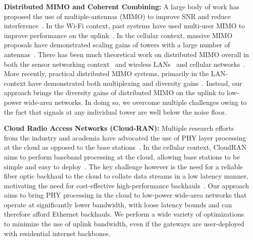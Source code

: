 \noindent \textbf{Distributed MIMO and Coherent Combining: } A large body of work has proposed the use of multiple-antennas (MIMO) to improve SNR and reduce interference~\cite{xie2014scalable, lin2011random, kumar2013bringing}. In the Wi-Fi context, past systems have used multi-user MIMO to improve performance on the uplink~\cite{shen2014rate, tan2009sam, xie2014scalable}. In the cellular context, massive MIMO proposals have demonstrated scaling gains of towers with a large number of antennas~\cite{shepard2012argos, larsson2014massive}. There has been much theoretical work on distributed MIMO overall in both the sensor networking context~\cite{del2007cooperative} and wireless LANs~\cite{dohler2004resource} and cellular networks~\cite{sawahashi2010coordinated}.  More recently, practical distributed MIMO systems, primarily in the LAN-context have demonstrated both multiplexing and diversity gains~\cite{hamed2016real, yenamandra2014vidyut, rahul2012jmb}. Instead, our approach brings the diversity gains of distributed MIMO on the uplink to low-power wide-area networks. In doing so, we overcome multiple challenges owing to the fact that signals at any individual tower are well below the noise floor. \\\vspace*{-0.1in}


\noindent \textbf{Cloud Radio Access Networks (Cloud-RAN): } Multiple research efforts from the industry and academia have advocated the use of PHY layer processing at the cloud as opposed to the base stations~\cite{sabella2013ran, hadzialic2013cloud}. In the cellular context, CloudRAN aims to perform baseband processing at the cloud, allowing base stations to be simple and easy to deploy~\cite{checko2015cloud, wubben2014benefits}. The key challenge however is the need for a reliable fiber optic backhaul to the cloud to collate data streams in a low latency manner, motivating the need for cost-effective high-performance backhauls~\cite{liu2013case, chih2014recent}.  Our approach aims to bring PHY processing in the cloud to low-power wide-area networks that operate at significantly lower bandwidth, with loose latency bounds and can therefore afford Ethernet backhauls. We perform a wide variety of optimizations to minimize the use of uplink bandwidth, even if the gateways are user-deployed with residential internet backbones. 


